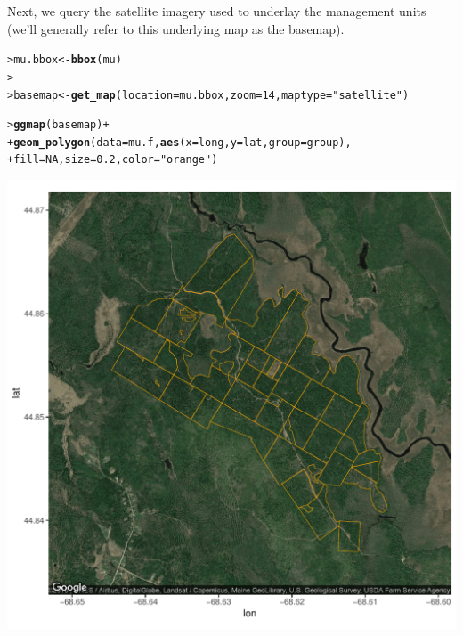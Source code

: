 \documentclass[12pt,oneside]{book}\usepackage[]{graphicx}\usepackage[]{color}
\makeatletter
\def\maxwidth{ %
  \ifdim\Gin@nat@width>\linewidth
    \linewidth
  \else
    \Gin@nat@width
  \fi
}
\newcommand{\hlnum}[1]{\textcolor[rgb]{0.686,0.059,0.569}{#1}}%
\newcommand{\hlstr}[1]{\textcolor[rgb]{0.192,0.494,0.8}{#1}}%
\newcommand{\hlopt}[1]{\textcolor[rgb]{0,0,0}{#1}}%
\newcommand{\hlstd}[1]{\textcolor[rgb]{0.345,0.345,0.345}{#1}}%
\newcommand{\hlkwb}[1]{\textcolor[rgb]{0.69,0.353,0.396}{#1}}%
\newcommand{\hlkwc}[1]{\textcolor[rgb]{0.333,0.667,0.333}{#1}}%
\newcommand{\hlkwd}[1]{\textcolor[rgb]{0.737,0.353,0.396}{\textbf{#1}}}%
\newenvironment{kframe}{%
 \def\at@end@of@kframe{}%
 \ifinner\ifhmode%
  \def\at@end@of@kframe{\end{minipage}}%
  \begin{minipage}{\columnwidth}%
 \fi\fi%
 \def\FrameCommand##1{\hskip\@totalleftmargin \hskip-\fboxsep
 \colorbox{shadecolor}{##1}\hskip-\fboxsep
     \hskip-\linewidth \hskip-\@totalleftmargin \hskip\columnwidth}%
 \MakeFramed {\advance\hsize-\width
   \@totalleftmargin\z@ \linewidth\hsize
   \@setminipage}}%
 {\par\unskip\endMakeFramed%
 \at@end@of@kframe}
\newenvironment{knitrout}{}{} %
\makeatother
\begin{document}
Next, we query the satellite imagery used to underlay the management units (we'll generally refer to this underlying map as the basemap).
\begin{knitrout}
\color{fgcolor}\begin{kframe}
\begin{alltt}
\hlstd{> }\hlstd{mu.bbox} \hlkwb{<-} \hlkwd{bbox}\hlstd{(mu)}
\hlstd{> }
\hlstd{> }\hlstd{basemap} \hlkwb{<-} \hlkwd{get_map}\hlstd{(}\hlkwc{location}\hlstd{=mu.bbox,} \hlkwc{zoom} \hlstd{=} \hlnum{14}\hlstd{,} \hlkwc{maptype}\hlstd{=}\hlstr{"satellite"}\hlstd{)}
\end{alltt}


{\ttfamily\noindent\color{warningcolor}{Warning: bounding box given to google - spatial extent only approximate.}}

{\ttfamily\noindent\itshape\color{messagecolor}{converting bounding box to center/zoom specification. (experimental)}}

{\ttfamily\noindent\itshape\color{messagecolor}{Map from URL : http://maps.googleapis.com/maps/api/staticmap?center=44.852323,-68.625803\&zoom=14\&size=640x640\&scale=2\&maptype=satellite\&language=en-EN\&sensor=false}}\begin{alltt}
\hlstd{> }\hlkwd{ggmap}\hlstd{(basemap)} \hlopt{+}
\hlstd{+ }    \hlkwd{geom_polygon}\hlstd{(}\hlkwc{data}\hlstd{=mu.f,} \hlkwd{aes}\hlstd{(}\hlkwc{x} \hlstd{= long,} \hlkwc{y} \hlstd{= lat,} \hlkwc{group}\hlstd{=group),}
\hlstd{+ }                 \hlkwc{fill}\hlstd{=}\hlnum{NA}\hlstd{,} \hlkwc{size}\hlstd{=}\hlnum{0.2}\hlstd{,} \hlkwc{color}\hlstd{=}\hlstr{"orange"}\hlstd{)}
\end{alltt}
\end{kframe}
\includegraphics[width=\maxwidth]{figure/unnamed-chunk-187-1} 

\end{knitrout}
\end{document}

